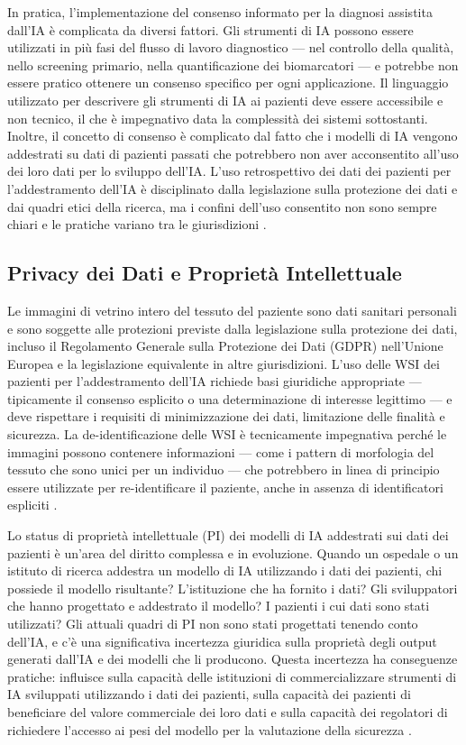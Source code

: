 In pratica, l'implementazione del consenso informato per la diagnosi assistita dall'IA è complicata da diversi fattori. Gli strumenti di IA possono essere utilizzati in più fasi del flusso di lavoro diagnostico — nel controllo della qualità, nello screening primario, nella quantificazione dei biomarcatori — e potrebbe non essere pratico ottenere un consenso specifico per ogni applicazione. Il linguaggio utilizzato per descrivere gli strumenti di IA ai pazienti deve essere accessibile e non tecnico, il che è impegnativo data la complessità dei sistemi sottostanti. Inoltre, il concetto di consenso è complicato dal fatto che i modelli di IA vengono addestrati su dati di pazienti passati che potrebbero non aver acconsentito all'uso dei loro dati per lo sviluppo dell'IA. L'uso retrospettivo dei dati dei pazienti per l'addestramento dell'IA è disciplinato dalla legislazione sulla protezione dei dati e dai quadri etici della ricerca, ma i confini dell'uso consentito non sono sempre chiari e le pratiche variano tra le giurisdizioni \cite{hanna2024}.

\subsection{Privacy dei Dati e Proprietà Intellettuale}

Le immagini di vetrino intero del tessuto del paziente sono dati sanitari personali e sono soggette alle protezioni previste dalla legislazione sulla protezione dei dati, incluso il Regolamento Generale sulla Protezione dei Dati (GDPR) nell'Unione Europea e la legislazione equivalente in altre giurisdizioni. L'uso delle WSI dei pazienti per l'addestramento dell'IA richiede basi giuridiche appropriate — tipicamente il consenso esplicito o una determinazione di interesse legittimo — e deve rispettare i requisiti di minimizzazione dei dati, limitazione delle finalità e sicurezza. La de-identificazione delle WSI è tecnicamente impegnativa perché le immagini possono contenere informazioni — come i pattern di morfologia del tessuto che sono unici per un individuo — che potrebbero in linea di principio essere utilizzate per re-identificare il paziente, anche in assenza di identificatori espliciti \cite{zhang2023}.

Lo status di proprietà intellettuale (PI) dei modelli di IA addestrati sui dati dei pazienti è un'area del diritto complessa e in evoluzione. Quando un ospedale o un istituto di ricerca addestra un modello di IA utilizzando i dati dei pazienti, chi possiede il modello risultante? L'istituzione che ha fornito i dati? Gli sviluppatori che hanno progettato e addestrato il modello? I pazienti i cui dati sono stati utilizzati? Gli attuali quadri di PI non sono stati progettati tenendo conto dell'IA, e c'è una significativa incertezza giuridica sulla proprietà degli output generati dall'IA e dei modelli che li producono. Questa incertezza ha conseguenze pratiche: influisce sulla capacità delle istituzioni di commercializzare strumenti di IA sviluppati utilizzando i dati dei pazienti, sulla capacità dei pazienti di beneficiare del valore commerciale dei loro dati e sulla capacità dei regolatori di richiedere l'accesso ai pesi del modello per la valutazione della sicurezza \cite{hanna2024}.


